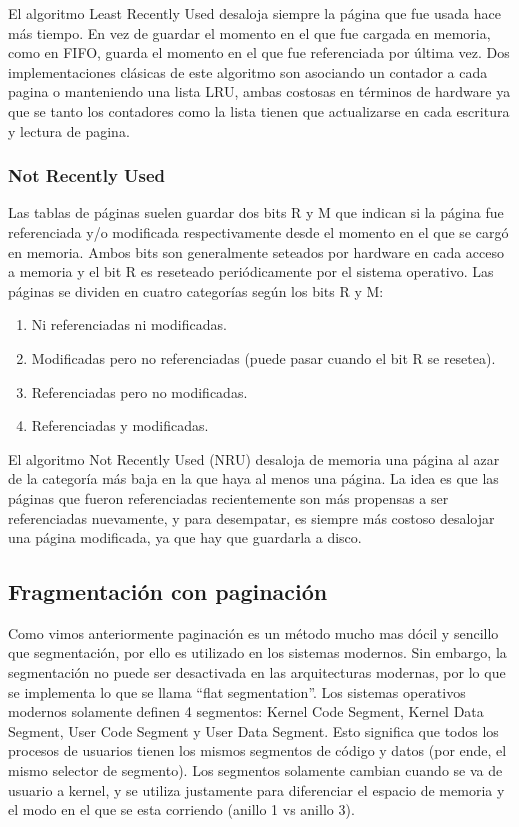 \documentclass{article}
\begin{document}
El algoritmo Least Recently Used desaloja siempre la p\'agina que fue usada hace m\'as tiempo. En vez de guardar el momento en el que fue cargada en memoria, como en FIFO, guarda el momento en el que fue referenciada por \'ultima vez. Dos implementaciones clásicas de este algoritmo son asociando un contador a cada pagina o manteniendo una lista LRU, ambas costosas en términos de hardware ya que se tanto los contadores como la lista tienen que actualizarse en cada escritura y lectura de pagina.


\subsubsection{Not Recently Used}

Las tablas de p\'aginas suelen guardar dos bits R y M que indican si la p\'agina fue referenciada y/o modificada respectivamente desde el momento en el que se carg\'o en memoria. Ambos bits son generalmente seteados por hardware en cada acceso a memoria y el bit R es reseteado peri\'odicamente por el sistema operativo. Las p\'aginas se dividen en cuatro categor\'ias seg\'un los bits R y M:

\begin{enumerate}
\item Ni referenciadas ni modificadas.
\item Modificadas pero no referenciadas (puede pasar cuando el bit R se resetea).
\item Referenciadas pero no modificadas.
\item Referenciadas y modificadas.
\end{enumerate}

El algoritmo Not Recently Used (NRU) desaloja de memoria una p\'agina al azar de la categor\'ia m\'as baja en la que haya al menos una p\'agina. La idea es que las p\'aginas que fueron referenciadas recientemente son m\'as propensas a ser referenciadas nuevamente, y para desempatar, es siempre m\'as costoso desalojar una p\'agina modificada, ya que hay que guardarla a disco.

\subsection{Fragmentación con paginación}

Como vimos anteriormente paginación es un método mucho mas dócil y sencillo que segmentación, por ello es utilizado en los sistemas modernos. Sin embargo, la segmentación no puede ser desactivada en las arquitecturas modernas, por lo que se implementa lo que se llama ``flat segmentation''. Los sistemas operativos modernos solamente definen 4 segmentos: Kernel Code Segment, Kernel Data Segment, User Code Segment y User Data Segment. Esto significa que todos los procesos de usuarios tienen los mismos segmentos de código y datos (por ende, el mismo selector de segmento). Los segmentos solamente cambian cuando se va de usuario a kernel, y se utiliza justamente para diferenciar el espacio de memoria y el modo en el que se esta corriendo (anillo 1 vs anillo 3).
\end{document}
